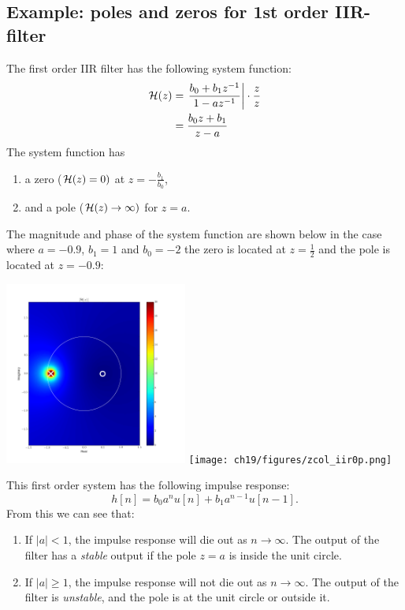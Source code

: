     \subsection{Example: poles and zeros for 1st order IIR-filter}
    The first order IIR filter has the following system function:
    \begin{align}
        \mathcal{H}(z) & = \left.\frac{b_0 + b_1 z^{-1}}{1-a z^{-1}} \right| \cdot \frac{z}{z} \\
             & = \frac{b_0 z + b_1}{z-a}
    \end{align}
    The system function has
    \begin{enumerate}
        \item a zero ($\mathcal{H}(z) = 0)$ at $z=-\frac{b_1}{b_0}$,
        \item and a pole ($\mathcal{H}(z) \rightarrow \infty)$ for $z=a$.
    \end{enumerate}
    The magnitude and phase of the system function are shown below in the case where $a=-0.9$, $b_1=1$ and $b_0=-2$
    the zero is located at $z = \frac{1}{2}$ and the pole is located at $z=-0.9$:
    \begin{center}
        \includegraphics[width=0.45\textwidth]{ch19/figures/zcol_iir0.png}
        \texttt{[image: ch19/figures/zcol\_iir0p.png]}
    \end{center}
    This first order system has the following impulse response:
    \begin{equation}
        h[n] = b_0 a^n u[n] + b_1 a^{n-1} u[n-1].
    \end{equation}
    From this we can see that:
    \begin{enumerate}
        \item If $|a|<1$, the impulse response will die out as $n\rightarrow \infty$.
              The output of the filter has a \emph{stable} output if the pole $z=a$ is inside the unit circle.
        \item If $|a|\ge 1$, the impulse response will not die out as $n\rightarrow \infty$.
              The output of the filter is \emph{unstable}, and the pole is at the unit circle or outside it.
    \end{enumerate}
\fi


